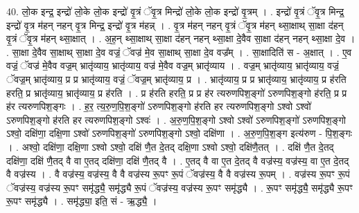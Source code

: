 \documentclass[17pt]{extarticle}
\begin{document}
40. लो॒क इन्द्र॒ इन्द्रो॑ लो॒के लो॒क इन्द्रो॑ वृ॒त्रं ॅवृ॒त्र मिन्द्रो॑ लो॒के लो॒क इन्द्रो॑ वृ॒त्रम् । . इन्द्रो॑ वृ॒त्रं ॅवृ॒त्र मिन्द्र॒ इन्द्रो॑ वृ॒त्र म॑हन् नहन् वृ॒त्र मिन्द्र॒ इन्द्रो॑ वृ॒त्र म॑हन्न् । . वृ॒त्र म॑हन् नहन् वृ॒त्रं ॅवृ॒त्र म॑हन् थ्सा॒क्षाथ् सा॒क्षा द॑हन् वृ॒त्रं ॅवृ॒त्र म॑हन् थ्सा॒क्षात् । . अ॒ह॒न् थ्सा॒क्षाथ् सा॒क्षा द॑हन् नहन् थ्सा॒क्षा दे॒वैव सा॒क्षा द॑हन् नहन् थ्सा॒क्षा दे॒व । . सा॒क्षा दे॒वैव सा॒क्षाथ् सा॒क्षा दे॒व वज्रं॒ ॅवज्र॑ मे॒व सा॒क्षाथ् सा॒क्षा दे॒व वज्र᳚म् । . सा॒क्षादिति॑ स - अ॒क्षात् । . ए॒व वज्रं॒ ॅवज्र॑ मे॒वैव वज्र॒म् भ्रातृ॑व्याय॒ भ्रातृ॑व्याय॒ वज्र॑ मे॒वैव वज्र॒म् भ्रातृ॑व्याय । . वज्र॒म् भ्रातृ॑व्याय॒ भ्रातृ॑व्याय॒ वज्रं॒ ॅवज्र॒म् भ्रातृ॑व्याय॒ प्र प्र भ्रातृ॑व्याय॒ वज्रं॒ ॅवज्र॒म् भ्रातृ॑व्याय॒ प्र । . भ्रातृ॑व्याय॒ प्र प्र भ्रातृ॑व्याय॒ भ्रातृ॑व्याय॒ प्र ह॑रति हरति॒ प्र भ्रातृ॑व्याय॒ भ्रातृ॑व्याय॒ प्र ह॑रति । . प्र ह॑रति हरति॒ प्र प्र ह॑र त्यरुणपिश॒ङ्गो॑ ऽरुणपिश॒ङ्गो ह॑रति॒ प्र प्र ह॑र त्यरुणपिश॒ङ्गः । . ह॒र॒ त्य॒रु॒ण॒पि॒श॒ङ्गो॑ ऽरुणपिश॒ङ्गो ह॑रति हर त्यरुणपिश॒ङ्गो ऽश्वो ऽश्वो॑ ऽरुणपिश॒ङ्गो ह॑रति हर त्यरुणपिश॒ङ्गो ऽश्वः॑ । . अ॒रु॒ण॒पि॒श॒ङ्गो ऽश्वो ऽश्वो॑ ऽरुणपिश॒ङ्गो॑ ऽरुणपिश॒ङ्गो ऽश्वो॒ दक्षि॑णा॒ दक्षि॒णा ऽश्वो॑ ऽरुणपिश॒ङ्गो॑ ऽरुणपिश॒ङ्गो ऽश्वो॒ दक्षि॑णा । . अ॒रु॒ण॒पि॒श॒ङ्ग इत्य॑रुण - पि॒श॒ङ्गः । . अश्वो॒ दक्षि॑णा॒ दक्षि॒णा ऽश्वो ऽश्वो॒ दक्षि॑ णै॒त दे॒तद् दक्षि॒णा ऽश्वो ऽश्वो॒ दक्षि॑णै॒तत् । . दक्षि॑ णै॒त दे॒तद् दक्षि॑णा॒ दक्षि॑ णै॒तद् वै वा ए॒तद् दक्षि॑णा॒ दक्षि॑ णै॒तद् वै । . ए॒तद् वै वा ए॒त दे॒तद् वै वज्र॑स्य॒ वज्र॑स्य॒ वा ए॒त दे॒तद् वै वज्र॑स्य । . वै वज्र॑स्य॒ वज्र॑स्य॒ वै वै वज्र॑स्य रू॒पꣳ रू॒पं ॅवज्र॑स्य॒ वै वै वज्र॑स्य रू॒पम् । . वज्र॑स्य रू॒पꣳ रू॒पं ॅवज्र॑स्य॒ वज्र॑स्य रू॒पꣳ समृ॑द्ध्यै॒ समृ॑द्ध्यै रू॒पं ॅवज्र॑स्य॒ वज्र॑स्य रू॒पꣳ समृ॑द्ध्यै । . रू॒पꣳ समृ॑द्ध्यै॒ समृ॑द्ध्यै रू॒पꣳ रू॒पꣳ समृ॑द्ध्यै । . समृ॑द्ध्या॒ इति॒ सं - ऋ॒द्ध्यै॒ । \newline
\pagebreak
\end{document}
